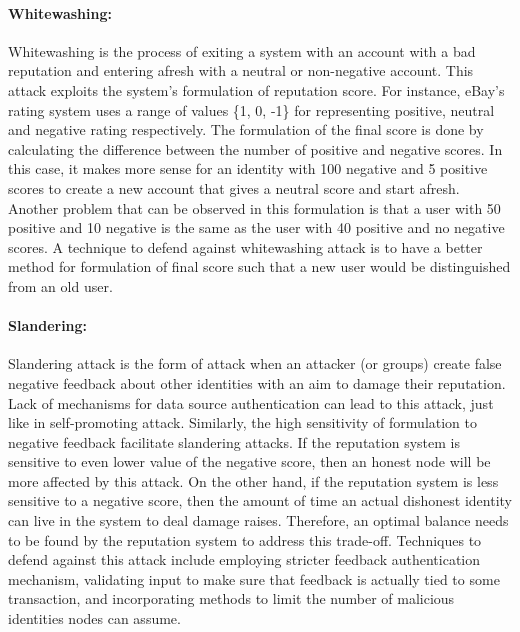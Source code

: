 \paragraph{Whitewashing:} Whitewashing is the process of exiting a system with
an account with a bad reputation and entering afresh with a neutral or
non-negative account. This attack exploits the system's formulation of
reputation score. For instance, eBay's rating system uses a range of values
\{1, 0, -1\} for representing positive, neutral and negative rating
respectively. The formulation of the final score is done by calculating the
difference between the number of positive and negative scores. In this case, it
makes more sense for an identity with 100 negative and 5 positive scores to
create a new account that gives a neutral score and start afresh. Another
problem that can be observed in this formulation is that a user with 50
positive and 10 negative is the same as the user with 40 positive and no
negative scores. A technique to defend against whitewashing attack is to have a
better method for formulation of final score such that a new user would be
distinguished from an old user. 
\paragraph{Slandering:} Slandering attack is the form of attack when an
attacker (or groups) create false negative feedback about other identities with
an aim to damage their reputation. Lack of mechanisms for data source
authentication can lead to this attack, just like in self-promoting attack.
Similarly, the high sensitivity of formulation to negative feedback facilitate
slandering attacks. If the reputation system is sensitive to even lower value
of the negative score, then an honest node will be more affected by this
attack. On the other hand, if the reputation system is less sensitive to a
negative score, then the amount of time an actual dishonest identity can live
in the system to deal damage raises. Therefore, an optimal balance needs to be
found by the reputation system to address this trade-off. Techniques to defend
against this attack include employing stricter feedback authentication
mechanism, validating input to make sure that feedback is actually tied to some
transaction, and incorporating methods to limit the number of malicious
identities nodes can assume.   
